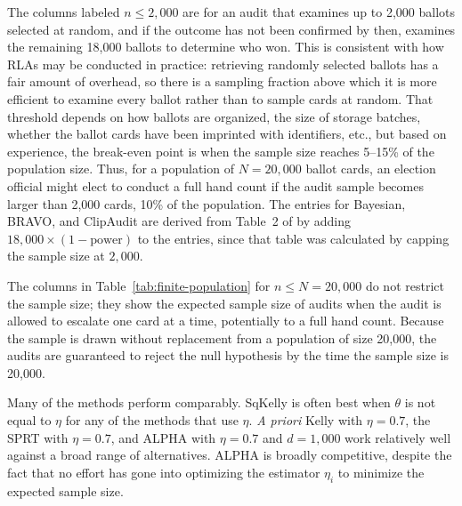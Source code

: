 \documentclass[aoas]{imsart}
\begin{document}
The columns labeled $n \le 2{,}000$ are for an audit that examines up to 2,000 ballots selected at random, and
if the outcome has not been confirmed by then, examines the remaining 18,000 ballots to determine who won.
This is consistent with how RLAs may be conducted in practice: retrieving randomly selected ballots has a fair amount of 
overhead, so there is a sampling fraction above which it is more efficient to examine every ballot rather than to sample cards
at random.
That threshold depends on how ballots are organized, the size of storage batches, whether the ballot cards have been
imprinted with identifiers, etc., but based on experience, the break-even point 
is when the sample size reaches 5--15\% of the
population size.
Thus, for a population of $N=20{,}000$ ballot cards, an election official might elect to conduct a full hand count
if the audit sample becomes larger than 2,000 cards, 10\% of the population. 
The entries for Bayesian, BRAVO, and ClipAudit are derived from Table~2 of \citet{huangEtal20} by adding 
$18,000 \times (1-\mbox{power})$ to the entries, since that table was calculated by capping the sample size
at $2,000$.

The columns in Table~\ref{tab:finite-population}  for $n \le N = 20{,}000$ do not restrict the sample size;
they show the expected sample size of audits when the audit is allowed to escalate one card at a time,
potentially to a full hand count.
Because the sample is drawn without replacement from a population of size 20,000, the audits are guaranteed to reject the
null hypothesis by the time the sample size is 20,000.

Many of the methods perform comparably. 
SqKelly is often best when $\theta$ is not equal to $\eta$ for any of the methods that
use $\eta$.
\emph{A priori} Kelly with $\eta=0.7$, the SPRT with $\eta=0.7$, and ALPHA with $\eta=0.7$ and $d=1{,}000$
work relatively well against a broad range of alternatives.
ALPHA is broadly competitive, despite the fact that no effort has gone into optimizing the estimator $\eta_i$ to minimize
the expected sample size.
\end{document}
